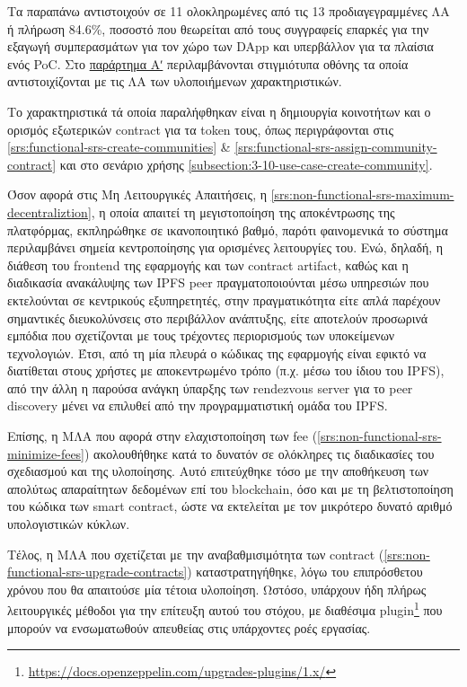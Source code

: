 Τα παραπάνω αντιστοιχούν σε 11 ολοκληρωμένες από τις 13 προδιαγεγραμμένες ΛΑ ή πλήρωση 84.6\%, ποσοστό που θεωρείται από τους συγγραφείς επαρκές για την εξαγωγή συμπερασμάτων για τον χώρο των DApp και υπερβάλλον για τα πλαίσια ενός PoC. Στο \hyperref[{appendix-a}]{παράρτημα Αʹ} περιλαμβάνονται στιγμιότυπα οθόνης τα οποία αντιστοιχίζονται με τις ΛΑ των υλοποιήμενων χαρακτηριστικών.

Το χαρακτηριστικά τά οποία παραλήφθηκαν είναι η δημιουργία κοινοτήτων και ο ορισμός εξωτερικών contract για τα token τους, όπως περιγράφονται στις \ref{srs:functional-srs-create-communities} \& \ref{srs:functional-srs-assign-community-contract} και στο σενάριο χρήσης \ref{subsection:3-10-use-case-create-community}.

Όσον αφορά στις Μη Λειτουργικές Απαιτήσεις, η \ref{srs:non-functional-srs-maximum-decentraliztion}, η οποία απαιτεί τη μεγιστοποίηση της αποκέντρωσης της πλατφόρμας, εκπληρώθηκε σε ικανοποιητικό βαθμό, παρότι φαινομενικά το σύστημα περιλαμβάνει σημεία κεντροποίησης για ορισμένες λειτουργίες του. Ενώ, δηλαδή, η διάθεση του frontend της εφαρμογής και των contract artifact, καθώς και η διαδικασία ανακάλυψης των IPFS peer πραγματοποιούνται μέσω υπηρεσιών που εκτελούνται σε κεντρικούς εξυπηρετητές, στην πραγματικότητα είτε απλά παρέχουν σημαντικές διευκολύνσεις στο περιβάλλον ανάπτυξης, είτε αποτελούν προσωρινά εμπόδια που σχετίζονται με τους τρέχοντες περιορισμούς των υποκείμενων τεχνολογιών. Έτσι, από τη μία πλευρά ο κώδικας της εφαρμογής είναι εφικτό να διατίθεται στους χρήστες με αποκεντρωμένο τρόπο (π.χ. μέσω του ίδιου του IPFS), από την άλλη η παρούσα ανάγκη ύπαρξης των rendezvous server για το peer discovery μένει να επιλυθεί από την προγραμματιστική ομάδα του IPFS.

Επίσης, η ΜΛΑ που αφορά στην ελαχιστοποίηση των fee (\ref{srs:non-functional-srs-minimize-fees}) ακολουθήθηκε κατά το δυνατόν σε ολόκληρες τις διαδικασίες του σχεδιασμού και της υλοποίησης. Αυτό επιτεύχθηκε τόσο με την αποθήκευση των απολύτως απαραίτητων δεδομένων επί του blockchain, όσο και με τη βελτιστοποίηση του κώδικα των smart contract, ώστε να εκτελείται με τον μικρότερο δυνατό αριθμό υπολογιστικών κύκλων.

Τέλος, η ΜΛΑ που σχετίζεται με την αναβαθμισιμότητα των contract (\ref{srs:non-functional-srs-upgrade-contracts}) καταστρατηγήθηκε, λόγω του επιπρόσθετου χρόνου που θα απαιτούσε μία τέτοια υλοποίηση. Ωστόσο, υπάρχουν ήδη πλήρως λειτουργικές μέθοδοι για την επίτευξη αυτού του στόχου, με διαθέσιμα plugin\footnote{\url{https://docs.openzeppelin.com/upgrades-plugins/1.x/}} που μπορούν να ενσωματωθούν απευθείας στις υπάρχοντες ροές εργασίας.

